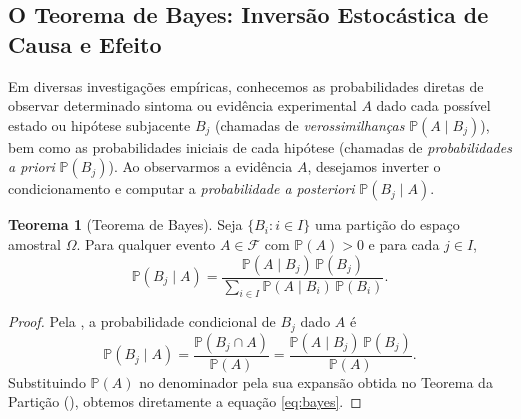 \documentclass[12pt,portuguese]{article}
\theoremstyle{definition}
\newtheorem{theorem}{Teorema}
\begin{document}
\subsection{O Teorema de Bayes: Inversão Estocástica de Causa e Efeito}

Em diversas investigações empíricas, conhecemos as probabilidades diretas de observar determinado sintoma ou evidência experimental \(A\) dado cada possível estado ou hipótese subjacente \(B_j\) (chamadas de \emph{verossimilhanças} \(\mathbb{P}(A \mid B_j)\)), bem como as probabilidades iniciais de cada hipótese (chamadas de \emph{probabilidades a priori} \(\mathbb{P}(B_j)\)). Ao observarmos a evidência \(A\), desejamos inverter o condicionamento e computar a \emph{probabilidade a posteriori} \(\mathbb{P}(B_j \mid A)\).

\begin{theorem}[Teorema de Bayes]\label{thm:bayes}
Seja \(\{B_i : i \in I\}\) uma partição do espaço amostral \(\Omega\). Para qualquer evento \(A \in \mathcal{F}\) com \(\mathbb{P}(A) > 0\) e para cada \(j \in I\),
\begin{equation}\label{eq:bayes}
  \mathbb{P}(B_j \mid A) = \frac{\mathbb{P}(A \mid B_j)\,\mathbb{P}(B_j)}{\sum_{i \in I} \mathbb{P}(A \mid B_i)\,\mathbb{P}(B_i)}.
\end{equation}
\end{theorem}

\begin{proof}
Pela , a probabilidade condicional de \(B_j\) dado \(A\) é
\[
  \mathbb{P}(B_j \mid A) = \frac{\mathbb{P}(B_j \cap A)}{\mathbb{P}(A)} = \frac{\mathbb{P}(A \mid B_j)\,\mathbb{P}(B_j)}{\mathbb{P}(A)}.
\]
Substituindo \(\mathbb{P}(A)\) no denominador pela sua expansão obtida no Teorema da Partição (), obtemos diretamente a equação \eqref{eq:bayes}.
\end{proof}
\end{document}
